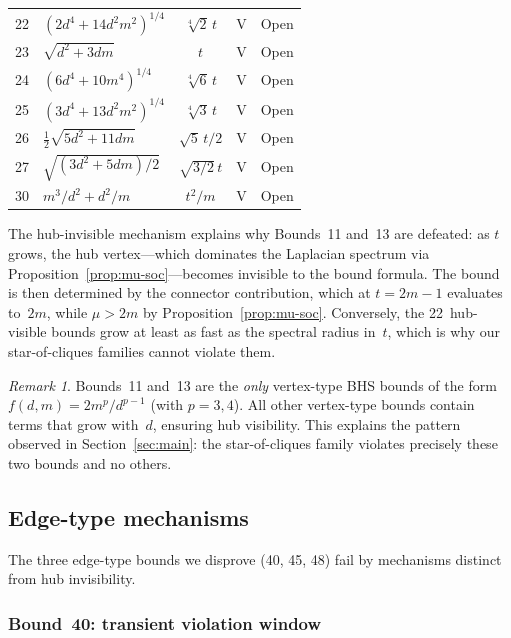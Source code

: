 \documentclass[preprint,12pt]{elsarticle}
\theoremstyle{definition}
\theoremstyle{remark}
\newtheorem{remark}[theorem]{Remark}
\newcommand{\Lspec}{\mu}               %
\begin{document}
\begin{table}[t]
\begin{tabular}{clccc}
    22 & $(2d^4{+}14d^2m^2)^{1/4}$ & $\sqrt[4]{2}\,t$            & V & Open \\
    23 & $\sqrt{d^2+3dm}$          & $t$                         & V & Open \\
    24 & $(6d^4{+}10m^4)^{1/4}$    & $\sqrt[4]{6}\,t$            & V & Open \\
    25 & $(3d^4{+}13d^2m^2)^{1/4}$ & $\sqrt[4]{3}\,t$            & V & Open \\
    26 & $\tfrac{1}{2}\sqrt{5d^2{+}11dm}$ & $\sqrt{5}\,t/2$      & V & Open \\
    27 & $\sqrt{(3d^2{+}5dm)/2}$   & $\sqrt{3/2}\,t$             & V & Open \\
    30 & $m^3/d^2 + d^2/m$         & $t^2/m$                     & V & Open \\
    \bottomrule
  \end{tabular}
\end{table}

The hub-invisible mechanism explains why Bounds~11 and~13 are defeated:
as $t$ grows, the hub vertex---which dominates the Laplacian spectrum
via Proposition~\ref{prop:mu-soc}---becomes invisible to the bound formula.
The bound is then determined by the connector contribution, which
at $t = 2m - 1$ evaluates to~$2m$, while $\Lspec > 2m$ by
Proposition~\ref{prop:mu-soc}.
Conversely, the 22~hub-visible bounds grow at least as fast as the
spectral radius in~$t$, which is why our star-of-cliques families
cannot violate them.

\begin{remark}\label{rem:hub-invisible-unique}
  Bounds~11 and~13 are the \emph{only} vertex-type BHS bounds of the
  form $f(d,m) = 2m^p/d^{p-1}$ (with $p = 3, 4$).  All other vertex-type
  bounds contain terms that grow with~$d$, ensuring hub visibility.  This
  explains the pattern observed in Section~\ref{sec:main}: the
  star-of-cliques family violates precisely these two bounds and no others.
\end{remark}

\subsection{Edge-type mechanisms}\label{ssec:edge-mechanism}

The three edge-type bounds we disprove (40, 45, 48) fail by mechanisms
distinct from hub invisibility.

\subsubsection{Bound~40: transient violation window}\label{sssec:bound40}
\end{document}
